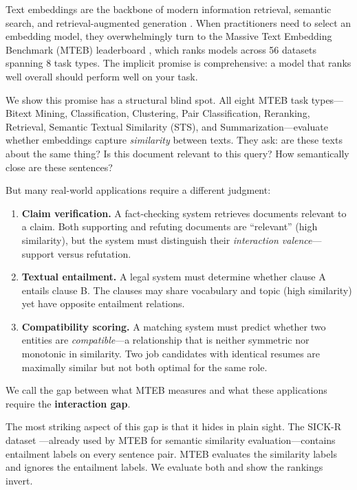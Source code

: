 \documentclass{article}
\begin{document}
Text embeddings are the backbone of modern information retrieval, semantic search, and retrieval-augmented generation \citep{karpukhin2020dpr, lewis2020rag}. When practitioners need to select an embedding model, they overwhelmingly turn to the Massive Text Embedding Benchmark (MTEB) leaderboard \citep{muennighoff2023mteb}, which ranks models across 56 datasets spanning 8 task types. The implicit promise is comprehensive: a model that ranks well overall should perform well on your task.

We show this promise has a structural blind spot. All eight MTEB task types---Bitext Mining, Classification, Clustering, Pair Classification, Reranking, Retrieval, Semantic Textual Similarity (STS), and Summarization---evaluate whether embeddings capture \emph{similarity} between texts. They ask: are these texts about the same thing? Is this document relevant to this query? How semantically close are these sentences?

But many real-world applications require a different judgment:

\begin{enumerate}[leftmargin=*, itemsep=2pt]
    \item \textbf{Claim verification.} A fact-checking system retrieves documents relevant to a claim. Both supporting and refuting documents are ``relevant'' (high similarity), but the system must distinguish their \emph{interaction valence}---support versus refutation.

    \item \textbf{Textual entailment.} A legal system must determine whether clause A entails clause B. The clauses may share vocabulary and topic (high similarity) yet have opposite entailment relations.

    \item \textbf{Compatibility scoring.} A matching system must predict whether two entities are \emph{compatible}---a relationship that is neither symmetric nor monotonic in similarity. Two job candidates with identical resumes are maximally similar but not both optimal for the same role.
\end{enumerate}

We call the gap between what MTEB measures and what these applications require the \textbf{interaction gap}.

The most striking aspect of this gap is that it hides in plain sight. The SICK-R dataset \citep{marelli2014sick}---already used by MTEB for semantic similarity evaluation---contains entailment labels on every sentence pair. MTEB evaluates the similarity labels and ignores the entailment labels. We evaluate both and show the rankings invert.
\end{document}
